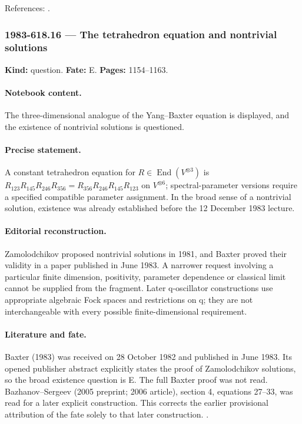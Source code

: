 \noindent References: \citep{belavindrinfeld1982classical,belavin1980discrete}.\par

\subsubsection{1983-618.16 --- The tetrahedron equation and nontrivial solutions}

\label{item:1983-618.16}

\noindent\textbf{Kind:} question. \textbf{Fate:} E. \textbf{Pages:} 1154--1163.\par

\paragraph{Notebook content.} The three-dimensional analogue of the Yang--Baxter equation is displayed, and the existence of nontrivial solutions is questioned.

\paragraph{Precise statement.} A constant tetrahedron equation for $R\in\operatorname{End}(V^{\otimes3})$ is $R_{123}R_{145}R_{246}R_{356}=R_{356}R_{246}R_{145}R_{123}$ on $V^{\otimes6}$; spectral-parameter versions require a specified compatible parameter assignment. In the broad sense of a nontrivial solution, existence was already established before the 12 December 1983 lecture.

\paragraph{Editorial reconstruction.} Zamolodchikov proposed nontrivial solutions in 1981, and Baxter proved their validity in a paper published in June 1983. A narrower request involving a particular finite dimension, positivity, parameter dependence or classical limit cannot be supplied from the fragment. Later q-oscillator constructions use appropriate algebraic Fock spaces and restrictions on q; they are not interchangeable with every possible finite-dimensional requirement.

\paragraph{Literature and fate.} Baxter (1983) was received on 28 October 1982 and published in June 1983. Its opened publisher abstract explicitly states the proof of Zamolodchikov solutions, so the broad existence question is E. The full Baxter proof was not read. Bazhanov--Sergeev (2005 preprint; 2006 article), section 4, equations 27--33, was read for a later explicit construction. This corrects the earlier provisional attribution of the fate solely to that later construction. \citep{zamolodchikov1981tetrahedron,baxter1983tetrahedron,bazhanovsergeev2006tetrahedron}.

